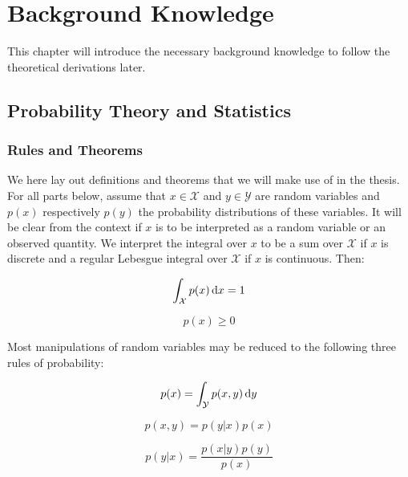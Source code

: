 
\chapter{Background Knowledge}
\label{BackgroundKnowledgeCh}

This chapter will introduce the necessary background knowledge to follow the
theoretical derivations later.

\section{Probability Theory and Statistics}

\subsection{Rules and Theorems}

We here lay out definitions and theorems that we will make use of in the thesis.
For all parts below, assume that $x \in \mathcal{X}$ and $y \in \mathcal{Y}$ are
random variables and $p(x)$ respectively $p(y)$ the probability distributions
of these variables. It will be clear from the context if $x$ is to be
interpreted as a random variable or an observed quantity. We interpret the
integral over $x$ to be a sum over $\mathcal{X}$ if $x$ is discrete and a
regular Lebesgue integral over $\mathcal{X}$ if $x$ is continuous. Then:
\begin{definition}
  \label{eq:unit_vol_prob_axiom}
  \begin{equation*}
    \int_{\mathcal{X}}p(x) \dif x = 1
  \end{equation*}
\end{definition}
\begin{definition}
  \label{eq:non_neg_of_prob}
  \begin{equation*}
    p(x) \geq 0
  \end{equation*}
\end{definition}

Most manipulations of random variables may be reduced to the following three rules of probability:
\begin{theorem}
  \label{eq:sum_rule}
  \begin{equation*}
    p(x) = \int_{\mathcal{Y}}p(x, y) \dif y
  \end{equation*}
\end{theorem}
\begin{theorem}
  \label{eq:product_theorem}
  \begin{equation*}
    p(x, y) = p(y | x)p(x)
  \end{equation*}
\end{theorem}
\begin{theorem}
  \label{eq:Bayes_theorem}
  \begin{equation*}
    p(y | x) = \frac{p(x | y)p(y)}{p(x)}
  \end{equation*}
\end{theorem}

